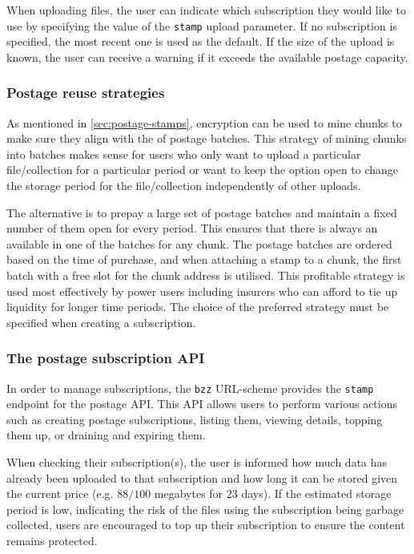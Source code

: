 When uploading files, the user can indicate which subscription they would like to use by specifying the value of the \lstinline{stamp} upload parameter. If no subscription is specified, the most recent one is used as the default. If the size of the upload is known, the user can receive a warning if it exceeds the available postage capacity. 

\subsubsection{Postage reuse strategies}

As mentioned in \ref{sec:postage-stamps}, encryption can be used to mine chunks to make sure they align with the  of postage batches. This strategy of mining chunks into batches makes sense for users who only want to upload a particular file/collection for a particular period or want to keep the option open to change the storage period for the file/collection independently of other uploads.

The alternative is to prepay a large set of postage batches and maintain a fixed number of them open for every period. This ensures that there is always an available   in one of the batches for any chunk. The postage batches are ordered based on the time of purchase, and when attaching a stamp to a chunk, the first batch with a free slot for the chunk address is utilised. This profitable strategy is used most effectively by power users including insurers who can afford to tie up liquidity for longer time periods. The choice of the preferred strategy must be specified when creating a subscription.

\subsubsection{The postage subscription API}

In order to manage subscriptions, the \lstinline{bzz} URL-scheme provides the \lstinline{stamp} endpoint for the postage API. This API allows users to perform various actions such as creating postage subscriptions, listing them, viewing details, topping them up, or draining and expiring them. 

When checking their subscription(s), the user is informed how much data has already been uploaded to that subscription and how long it can be stored given the current price (e.g. $88/100$ megabytes for $23$ days). If the estimated storage period is low, indicating the risk of the files using the subscription being garbage collected, users are encouraged to top up their subscription to ensure the content remains protected.


